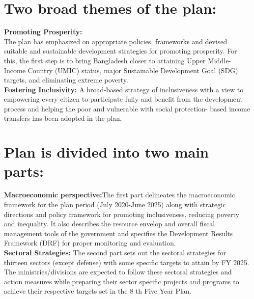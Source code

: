 \documentclass[a4paper,12pt]{book}
\begin{document}
   \section{Two broad themes of the plan:}
   \textbf{Promoting Prosperity:} \\
The plan has emphasized on appropriate policies,
frameworks and devised suitable and sustainable development strategies for promoting prosperity. For this, the first step is to bring Bangladesh closer to attaining Upper Middle-Income Country (UMIC) status, major Sustainable Development Goal (SDG) targets, and eliminating extreme poverty.\\
\textbf{Fostering Inclusivity:} A broad-based strategy of inclusiveness with a view to empowering every citizen to participate fully and benefit from the development process and helping the poor and vulnerable with social protection- based income transfers has been adopted in the plan.


\section{Plan is divided into two main parts:}
\textbf{Macroeconomic perspective:}The first part delineates the
macroeconomic framework for the plan period (July 2020-June 2025) along
with strategic directions and policy framework for promoting inclusiveness, reducing poverty and inequality. It also describes the resource envelop and overall fiscal management tools of the government and specifies the Development Results Framework (DRF) for proper monitoring and evaluation.\\
\textbf{Sectoral Strategies:} The second part sets out the sectoral strategies for thirteen sectors (except defense) with some specific targets to attain by FY 2025. The ministries/divisions are expected to follow these sectoral strategies and action measures while preparing their sector specific projects and programs to achieve their respective targets set in the 8 th Five Year Plan.
\end{document}
